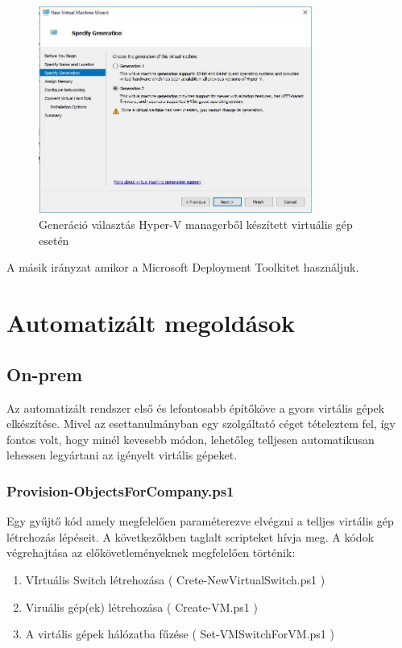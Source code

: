 \documentclass[12pt,oneside,justify]{book}
\begin{document}
 
\begin{figure}[t]
\includegraphics[width=0.8\textwidth]{generation_selection}
\caption{Generáció választás Hyper-V managerből készített virtuális gép esetén}
\label{fig:gen_selection}
\end{figure}


A másik irányzat amikor a Microsoft Deployment Toolkitet használjuk.

\section{Automatizált megoldások}
\noindent

\subsection{On-prem}
\noindent

Az automatizált rendszer első és lefontosabb építőköve a gyors virtális gépek elkészítése. Mivel az esettanulmányban egy szolgáltató céget tételeztem fel, így fontos volt, hogy minél kevesebb módon, lehetőleg telljesen automatikusan lehessen legyártani az igényelt virtális gépeket. 

\subsubsection{Provision-ObjectsForCompany.ps1}
Egy gyűjtő kód amely megfelelően paraméterezve elvégzni a telljes virtális gép létrehozás lépéseit. 
A következőkben taglalt scripteket hívja meg. 
A kódok végrehajtása az előkövetleményeknek megfelelően történik:
\begin{enumerate}
	\item VIrtuális Switch létrehozása ( Crete-NewVirtualSwitch.ps1 )
	\item Viruális gép(ek) létrehozása ( Create-VM.ps1 )
	\item A virtális gépek hálózatba fűzése ( Set-VMSwitchForVM.ps1 )
\end{enumerate}
\end{document}
